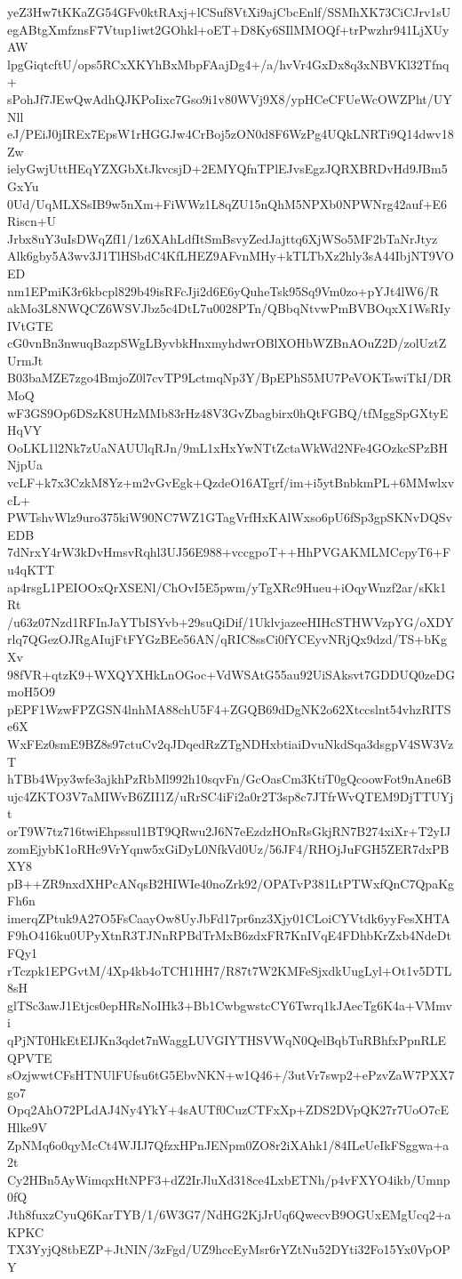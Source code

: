 yeZ3Hw7tKKaZG54GFv0ktRAxj+lCSuf8VtXi9ajCbcEnlf/SSMhXK73CiCJrv1sU
egABtgXmfznsF7Vtup1iwt2GOhkl+oET+D8Ky6SIlMMOQf+trPwzhr941LjXUyAW
lpgGiqtcftU/ops5RCxXKYhBxMbpFAajDg4+/a/hvVr4GxDx8q3xNBVKl32Tfnq+
sPohJf7JEwQwAdhQJKPoIixc7Gso9i1v80WVj9X8/ypHCeCFUeWcOWZPht/UYNll
eJ/PEiJ0jIREx7EpsW1rHGGJw4CrBoj5zON0d8F6WzPg4UQkLNRTi9Q14dwv18Zw
ielyGwjUttHEqYZXGbXtJkvcsjD+2EMYQfnTPlEJvsEgzJQRXBRDvHd9JBm5GxYu
0Ud/UqMLXSsIB9w5nXm+FiWWz1L8qZU15nQhM5NPXb0NPWNrg42auf+E6Riscn+U
Jrbx8uY3uIsDWqZfI1/1z6XAhLdfItSmBsvyZedJajttq6XjWSo5MF2bTaNrJtyz
Alk6gby5A3wv3J1TlHSbdC4KfLHEZ9AFvnMHy+kTLTbXz2hly3sA44IbjNT9VOED
nm1EPmiK3r6kbcpl829b49isRFcJji2d6E6yQuheTsk95Sq9Vm0zo+pYJt4lW6/R
akMo3L8NWQCZ6WSVJbz5c4DtL7u0028PTn/QBbqNtvwPmBVBOqxX1WsRIyIVtGTE
cG0vnBn3nwuqBazpSWgLByvbkHnxmyhdwrOBlXOHbWZBnAOuZ2D/zolUztZUrmJt
B03baMZE7zgo4BmjoZ0l7cvTP9LctmqNp3Y/BpEPhS5MU7PeVOKTswiTkI/DRMoQ
wF3GS9Op6DSzK8UHzMMb83rHz48V3GvZbagbirx0hQtFGBQ/tfMggSpGXtyEHqVY
OoLKL1l2Nk7zUaNAUUlqRJn/9mL1xHxYwNTtZctaWkWd2NFe4GOzkcSPzBHNjpUa
vcLF+k7x3CzkM8Yz+m2vGvEgk+QzdeO16ATgrf/im+i5ytBnbkmPL+6MMwlxvcL+
PWTshvWlz9uro375kiW90NC7WZ1GTagVrfHxKAlWxso6pU6fSp3gpSKNvDQSvEDB
7dNrxY4rW3kDvHmsvRqhl3UJ56E988+vccgpoT++HhPVGAKMLMCcpyT6+Fu4qKTT
ap4rsgL1PEIOOxQrXSENl/ChOvI5E5pwm/yTgXRc9Hueu+iOqyWnzf2ar/sKk1Rt
/u63z07Nzd1RFInJaYTbISYvb+29suQiDif/1UklvjazeeHIHcSTHWVzpYG/oXDY
rlq7QGezOJRgAIujFtFYGzBEe56AN/qRIC8ssCi0fYCEyvNRjQx9dzd/TS+bKgXv
98fVR+qtzK9+WXQYXHkLnOGoc+VdWSAtG55au92UiSAksvt7GDDUQ0zeDGmoH5O9
pEPF1WzwFPZGSN4lnhMA88chU5F4+ZGQB69dDgNK2o62Xtccslnt54vhzRITSe6X
WxFEz0smE9BZ8s97ctuCv2qJDqedRzZTgNDHxbtiaiDvuNkdSqa3dsgpV4SW3VzT
hTBb4Wpy3wfe3ajkhPzRbMl992h10sqvFn/GcOasCm3KtiT0gQcoowFot9nAne6B
ujc4ZKTO3V7aMIWvB6ZII1Z/uRrSC4iFi2a0r2T3sp8c7JTfrWvQTEM9DjTTUYjt
orT9W7tz716twiEhpssul1BT9QRwu2J6N7eEzdzHOnRsGkjRN7B274xiXr+T2yIJ
zomEjybK1oRHc9VrYqnw5xGiDyL0NfkVd0Uz/56JF4/RHOjJuFGH5ZER7dxPBXY8
pB++ZR9nxdXHPcANqsB2HIWIe40noZrk92/OPATvP381LtPTWxfQnC7QpaKgFh6n
imerqZPtuk9A27O5FsCaayOw8UyJbFd17pr6nz3Xjy01CLoiCYVtdk6yyFesXHTA
F9hO416ku0UPyXtnR3TJNnRPBdTrMxB6zdxFR7KnIVqE4FDhbKrZxb4NdeDtFQy1
rTczpk1EPGvtM/4Xp4kb4oTCH1HH7/R87t7W2KMFeSjxdkUugLyl+Ot1v5DTL8sH
glTSc3awJ1Etjcs0epHRsNoIHk3+Bb1CwbgwstcCY6Twrq1kJAecTg6K4a+VMmvi
qPjNT0HkEtEIJKn3qdet7nWaggLUVGIYTHSVWqN0QelBqbTuRBhfxPpnRLEQPVTE
sOzjwwtCFsHTNUlFUfsu6tG5EbvNKN+w1Q46+/3utVr7swp2+ePzvZaW7PXX7go7
Opq2AhO72PLdAJ4Ny4YkY+4sAUTf0CuzCTFxXp+ZDS2DVpQK27r7UoO7cEHlke9V
ZpNMq6o0qyMcCt4WJIJ7QfzxHPnJENpm0ZO8r2iXAhk1/84ILeUeIkFSggwa+a2t
Cy2HBn5AyWimqxHtNPF3+dZ2IrJluXd318ce4LxbETNh/p4vFXYO4ikb/Umnp0fQ
Jth8fuxzCyuQ6KarTYB/1/6W3G7/NdHG2KjJrUq6QwecvB9OGUxEMgUcq2+aKPKC
TX3YyjQ8tbEZP+JtNIN/3zFgd/UZ9hccEyMsr6rYZtNu52DYti32Fo15Yx0VpOPY
